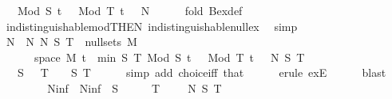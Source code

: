 \begin{isabellebody}
\ \ \ {\isacharparenleft}{\kern0pt}Mod\ S{\isacharparenright}{\kern0pt}\ t\ {\isasymomega}\ {\isasymnoteq}\ {\isacharparenleft}{\kern0pt}Mod\ T{\isacharparenright}{\kern0pt}\ t\ {\isasymomega}{\isacharbraceright}{\kern0pt}\ {\isasymsubseteq}\ N{\isachardoublequoteclose}\isanewline
\ \ \ \ \isamarkupfalse%
\ {\isacharparenleft}{\kern0pt}fold\ Bex{\isacharunderscore}{\kern0pt}def{\isacharparenright}{\kern0pt}\isanewline
\ \ \ \ \isamarkupfalse%
\ indistinguishable{\isacharunderscore}{\kern0pt}mod{\isacharbrackleft}{\kern0pt}THEN\ indistinguishable{\isacharunderscore}{\kern0pt}null{\isacharunderscore}{\kern0pt}ex{\isacharbrackright}{\kern0pt}\ \isamarkupfalse%
\ simp\isanewline
\ \ \isamarkupfalse%
\ \isamarkupfalse%
\ N\ \ N{\isacharcolon}{\kern0pt}\ {\isachardoublequoteopen}N\ S\ T\ {\isasymin}\ null{\isacharunderscore}{\kern0pt}sets\ {\isacharquery}{\kern0pt}M{\isachardoublequoteclose}\isanewline
\ \ \ \ {\isachardoublequoteopen}{\isacharbraceleft}{\kern0pt}{\isasymomega}\ {\isasymin}\ space\ {\isacharquery}{\kern0pt}M{\isachardot}{\kern0pt}\ {\isasymexists}t\ {\isasymin}\ {\isacharbraceleft}{\kern0pt}{}{\isachardot}{\kern0pt}{\isachardot}{\kern0pt}min\ S\ T{\isacharbraceright}{\kern0pt}{\isachardot}{\kern0pt}\ {\isacharparenleft}{\kern0pt}Mod\ S{\isacharparenright}{\kern0pt}\ t\ {\isasymomega}\ {\isasymnoteq}\ {\isacharparenleft}{\kern0pt}Mod\ T{\isacharparenright}{\kern0pt}\ t\ {\isasymomega}{\isacharbraceright}{\kern0pt}\ {\isasymsubseteq}\ N\ S\ T{\isachardoublequoteclose}\ \isanewline
\ \ \ {\isachardoublequoteopen}S\ {\isachargreater}{\kern0pt}\ {}{\isachardoublequoteclose}\ {\isachardoublequoteopen}T\ {\isachargreater}{\kern0pt}\ {}{\isachardoublequoteclose}\ \ S\ T\isanewline
\ \ \ \ \isamarkupfalse%
\ {\isacharparenleft}{\kern0pt}simp\ add{\isacharcolon}{\kern0pt}\ choice{\isacharunderscore}{\kern0pt}iff{\isacharprime}{\kern0pt}\ that{\isacharparenright}{\kern0pt}\isanewline
\ \ \ \ \isamarkupfalse%
\ {\isacharparenleft}{\kern0pt}erule\ exE{\isacharparenright}{\kern0pt}\isanewline
\ \ \ \ \isamarkupfalse%
\ blast\isanewline
\ \ \ \ \isamarkupfalse%
\isanewline
\ \ \isamarkupfalse%
\ N{\isacharunderscore}{\kern0pt}inf\ \ {\isachardoublequoteopen}N{\isacharunderscore}{\kern0pt}inf\ {\isasymequiv}\ {\isacharparenleft}{\kern0pt}{\isasymUnion}S\ {\isasymin}\ {\isasymnat}\ {\isacharminus}{\kern0pt}\ {\isacharbraceleft}{\kern0pt}{}{\isacharbraceright}{\kern0pt}{\isachardot}{\kern0pt}\ {\isacharparenleft}{\kern0pt}{\isasymUnion}\ T\ {\isasymin}\ {\isasymnat}\ {\isacharminus}{\kern0pt}\ {\isacharbraceleft}{\kern0pt}{}{\isacharbraceright}{\kern0pt}{\isachardot}{\kern0pt}\ N\ S\ T{\isacharparenright}{\kern0pt}{\isacharparenright}{\kern0pt}{\isachardoublequoteclose}\isanewline

\end{isabellebody}
